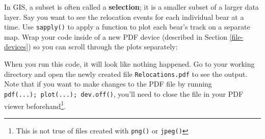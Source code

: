 \documentclass[]{book}
\newenvironment{Shaded}{\begin{snugshade}}{\end{snugshade}}
\newcommand{\CommentTok}[1]{\textcolor[rgb]{0.56,0.35,0.01}{\textit{#1}}}
\newcommand{\ControlFlowTok}[1]{\textcolor[rgb]{0.13,0.29,0.53}{\textbf{#1}}}
\newcommand{\DataTypeTok}[1]{\textcolor[rgb]{0.13,0.29,0.53}{#1}}
\newcommand{\DecValTok}[1]{\textcolor[rgb]{0.00,0.00,0.81}{#1}}
\newcommand{\FloatTok}[1]{\textcolor[rgb]{0.00,0.00,0.81}{#1}}
\newcommand{\KeywordTok}[1]{\textcolor[rgb]{0.13,0.29,0.53}{\textbf{#1}}}
\newcommand{\NormalTok}[1]{#1}
\newcommand{\OperatorTok}[1]{\textcolor[rgb]{0.81,0.36,0.00}{\textbf{#1}}}
\newcommand{\StringTok}[1]{\textcolor[rgb]{0.31,0.60,0.02}{#1}}
\let\rmarkdownfootnote\footnote%
\def\footnote{\protect\rmarkdownfootnote}
\begin{document}
In GIS, a subset is often called a \textbf{selection}; it is a smaller subset of a larger data layer. Say you want to see the relocation events for each individual bear at a time. Use \texttt{sapply()} to apply a function to plot each bear's track on a separate map. Wrap your code inside of a new PDF device (described in Section \ref{file-devices}) so you can scroll through the plots separately:

\begin{Shaded}
\end{Shaded}

When you run this code, it will look like nothing happened. Go to your working directory and open the newly created file \texttt{Relocations.pdf} to see the output. Note that if you want to make changes to the PDF file by running \texttt{pdf(...);\ plot(...);\ dev.off()}, you'll need to close the file in your PDF viewer beforehand\footnote{This is not true of files created with \texttt{png()} or \texttt{jpeg()}}.
\end{document}
